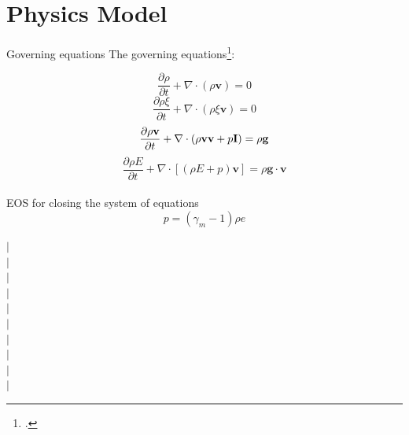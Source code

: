 \documentclass{beamer}
\begin{document}
\section{Physics Model}

\begin{frame}{Governing equations}
The governing equations\footcite{suzuki2005numerical}:\\
\begin{minipage}{.505\textwidth}
\begin{equation}
\dfrac{\partial \rho}{\partial t} + \nabla \cdot \left(\rho \textbf{v}\right) = 0 \label{eq:gov-cs-rho}
\end{equation}
\begin{equation}
\dfrac{\partial \rho \xi}{\partial t} + \nabla \cdot \left(\rho \xi \textbf{v}\right) = 0 \label{eq:gov-cs-ks}
\end{equation}
\begin{equation}
\dfrac{\partial \rho \textbf{v}}{\partial t} + \nabla \cdot \left(\rho \textbf{v} \textbf{v} + p\textbf{I}\right) = \rho \textbf{g} \label{eq:gov-cs-v} \\
\end{equation}
\begin{equation}
\dfrac{\partial \rho E}{\partial t} + \nabla \cdot \left[\left(\rho E + p \right)\textbf{v}\right] = \rho \textbf{g} \cdot\textbf{v} \label{eq:gov-cs-e}
\end{equation}\\
EOS for closing the system of equations
\begin{equation}
p = \left(\gamma_m - 1\right)\rho e \label{eq:EOS}
\end{equation}
%
\end{minipage} %
%
\begin{minipage}{.01\textwidth}
$\vert$\\
$\vert$\\
$\vert$\\
$\vert$\\
$\vert$\\
$\vert$\\
$\vert$\\
$\vert$\\
$\vert$\\
$\vert$\\
\end{minipage}
\begin{minipage}{.46\textwidth}

\end{minipage}
\end{frame}
\end{document}
